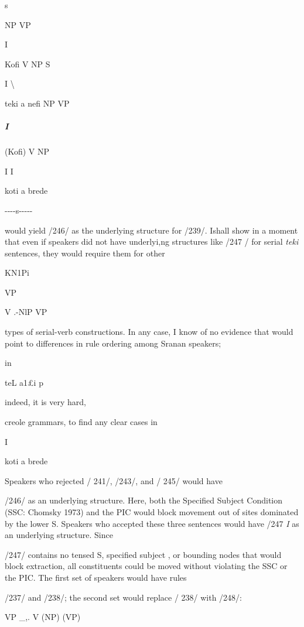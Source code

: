 \glt
\z

s

NP VP

I

Kofi V NP S


I {\textbackslash}


teki a nefi NP VP

\subparagraph{I}

(Kofi) V NP

I I

koti a brede



\ea\label{ex:247}

\glt
\z

{}-{}-{}-{}-s{}-{}-{}-{}-{}- 

would yield /246/ as the underlying structure for /239/. Ishall show in a moment that even if speakers did not have underlyi,ng structures like /247 / for serial \textit{teki} sentences, they would require them for other

KN1Pi

VP

V .{}-NlP VP

types of serial-verb constructions. In any case, I know of no evidence that would point to differences in rule ordering among Sranan speakers;

in

teL a1£i p

indeed, it is very hard,

creole grammars, to find any clear cases in

I 

koti a brede

Speakers who rejected / 241/, /243/, and / 245/ would have

/246/ as an underlying structure. Here, both the Specified Subject Condition (SSC: Chomsky 1973) and the PIC would block movement out of sites dominated by the lower S. Speakers who accepted these three sentences would have /247 \textit{I} as an underlying structure. Since

/247/ contains no tensed S, specified subject , or bounding nodes that would block extraction, all constituents could be moved without violating the SSC or the PIC. The first set of speakers would have rules

/237/ and /238/; the second set would replace / 238/ with /248/:

\ea\label{ex:248}
 VP \_,. V (NP) (VP)
\glt
\z

